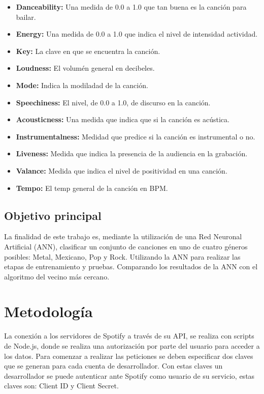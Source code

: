 \documentclass[conference]{IEEEtran}
\begin{document}
\begin{itemize}
	\item \textbf{Danceability:} Una medida de 0.0 a 1.0 que tan buena es la canción para bailar.
	\item \textbf{Energy:} Una medida de 0.0 a 1.0 que indica el nivel de intensidad actividad.
	\item \textbf{Key:} La clave en que se encuentra la canción.
	\item \textbf{Loudness:} El volumén general en decibeles.
	\item \textbf{Mode:} Indica la modiladad de la canción.
	\item \textbf{Speechiness:} El nivel, de 0.0 a 1.0, de discurso en la canción.
	\item \textbf{Acousticness:} Una medida que indica que si la canción es acústica.
	\item \textbf{Instrumentalness:} Medidad que predice si la canción es instrumental o no.
	\item \textbf{Liveness:} Medida que indica la presencia de la audiencia en la grabación.
	\item \textbf{Valance:} Medida que indica el nivel de positividad en una canción.
	\item \textbf{Tempo:} El temp general de la canción en BPM.\cite{spo}  \\
\end{itemize}

\subsection{Objetivo principal}
La finalidad de este trabajo es, mediante la utilización de una Red Neuronal Artificial (ANN), clasificar un conjunto de canciones en uno de cuatro géneros posibles: Metal, Mexicano, Pop y Rock. Utilizando la ANN para realizar las etapas de entrenamiento y pruebas. Comparando los resultados de la ANN con el algoritmo del vecino más cercano.\\

\section{Metodolog\'ia}
La conexión a los servidores de Spotify a través de su API, se realiza con scripts de Node.js, donde se realiza una autorización por parte del usuario para acceder a los datos. Para comenzar a realizar las peticiones se deben especificar dos claves que se generan para cada cuenta de desarrollador. Con estas claves un desarrollador se puede autenticar ante Spotify como usuario de su servicio, estas claves son: Client ID y Client Secret.\\
\end{document}
